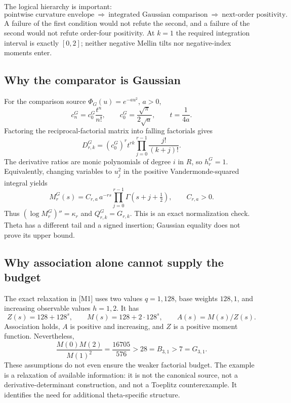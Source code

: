 \documentclass[11pt,letterpaper]{article}
\numberwithin{equation}{section}
\theoremstyle{remark}
\newcommand{\evid}[1]{\textsf{[#1]}}
\begin{document}
The logical hierarchy is important:
\[
 \text{pointwise curvature envelope}
 \ \Longrightarrow\ \text{integrated Gaussian comparison}
 \ \Longrightarrow\ \text{next-order positivity}.
\]
A failure of the first condition would not refute the second, and a
failure of the second would not refute order-four positivity. At $k=1$
the required integration interval is exactly $[0,2]$; neither negative
Mellin tilts nor negative-index moments enter.

\subsection{Why the comparator is Gaussian}

For the comparison source $\Phi_G(u)=e^{-au^2}$, $a>0$,
\[
 c_n^G=c_0^G\frac{t^n}{n!},\qquad
 c_0^G=\frac{\sqrt\pi}{2\sqrt a},\qquad t=\frac1{4a}.
\]
Factoring the reciprocal-factorial matrix into falling factorials gives
\begin{equation}
 D^G_{r,k}=(c_0^G)^r t^{rk}
                  \prod_{j=0}^{r-1}\frac{j!}{(k+j)!}. \label{eq:gaussD}
\end{equation}
The derivative ratios are monic polynomials of degree $i$ in $R$,
so $h_r^G=1$. Equivalently, changing variables to $u_j^2$ in the
positive Vandermonde-squared integral yields
\begin{equation}
 M_r^G(s)=C_{r,a}\,a^{-rs}
                 \prod_{j=0}^{r-1}\Gamma(s+j+\tfrac12),
 \qquad C_{r,a}>0. \label{eq:gaussM}
\end{equation}
Thus $(\log M_r^G)''=\kappa_r$ and $Q^G_{r,k}=G_{r,k}$.
This is an exact normalization check. Theta has a different tail and a
signed insertion; Gaussian equality does not prove its upper bound.

\subsection{Why association alone cannot supply the budget}

The exact relaxation in \evid{M1} uses two values $q=1,128$, base
weights $128,1$, and increasing observable values $h=1,2$. It has
\[
 Z(s)=128+128^s,\qquad M(s)=128+2\cdot128^s,\qquad A(s)=M(s)/Z(s).
\]
Association holds, $A$ is positive and increasing, and $Z$ is a positive
moment function. Nevertheless,
\begin{equation}
 \frac{M(0)M(2)}{M(1)^2}=\frac{16705}{576}>28=B_{3,1}>7=G_{3,1}.
\end{equation}
These assumptions do not even ensure the weaker factorial budget.
The example is a relaxation of available information: it is not the
canonical source, not a derivative-determinant construction, and not
a Toeplitz counterexample. It identifies the need for additional
theta-specific structure.
\end{document}
